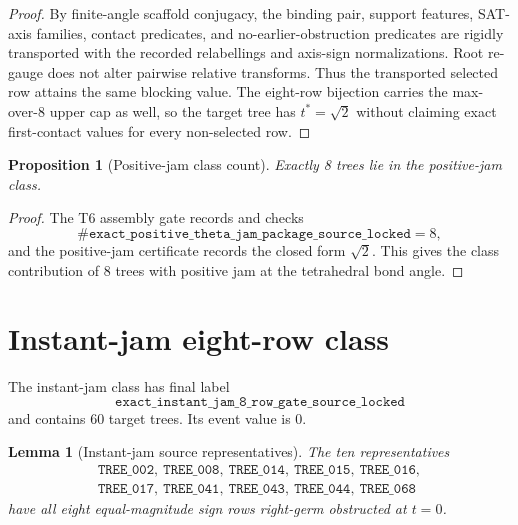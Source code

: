\documentclass[11pt,a4paper]{article}
\newtheorem{proposition}[theorem]{Proposition}
\newtheorem{lemma}[theorem]{Lemma}
\theoremstyle{definition}
\theoremstyle{remark}
\begin{document}
\begin{proof}
By finite-angle scaffold conjugacy, the binding pair, support features, SAT-axis families, contact predicates, and no-earlier-obstruction predicates are rigidly transported with the recorded relabellings and axis-sign normalizations.  Root re-gauge does not alter pairwise relative transforms.  Thus the transported selected row attains the same blocking value.  The eight-row bijection carries the max-over-8 upper cap as well, so the target tree has \(t^*=\sqrt{2}\) without claiming exact first-contact values for every non-selected row.
\end{proof}

\begin{proposition}[Positive-jam class count]
Exactly 8 trees lie in the positive-jam class.
\end{proposition}

\begin{proof}
The T6 assembly gate records and checks
\[
  \#\texttt{exact\_positive\_theta\_jam\_package\_source\_locked}=8,
\]
and the positive-jam certificate records the closed form \(\sqrt{2}\).  This gives the class contribution of 8 trees with positive jam at the tetrahedral bond angle.
\end{proof}



\section{Instant-jam eight-row class}

The instant-jam class has final label
\[
  \texttt{exact\_instant\_jam\_8\_row\_gate\_source\_locked}
\]
and contains 60 target trees.  Its event value is \(0\).

\begin{lemma}[Instant-jam source representatives]
The ten representatives
\[
\begin{gathered}
  \texttt{TREE\_002},\ \texttt{TREE\_008},\ \texttt{TREE\_014},\ \texttt{TREE\_015},\ \texttt{TREE\_016},\\
  \texttt{TREE\_017},\ \texttt{TREE\_041},\ \texttt{TREE\_043},\ \texttt{TREE\_044},\ \texttt{TREE\_068}
\end{gathered}
\]
have all eight equal-magnitude sign rows right-germ obstructed at \(t=0\).
\end{lemma}
\end{document}
